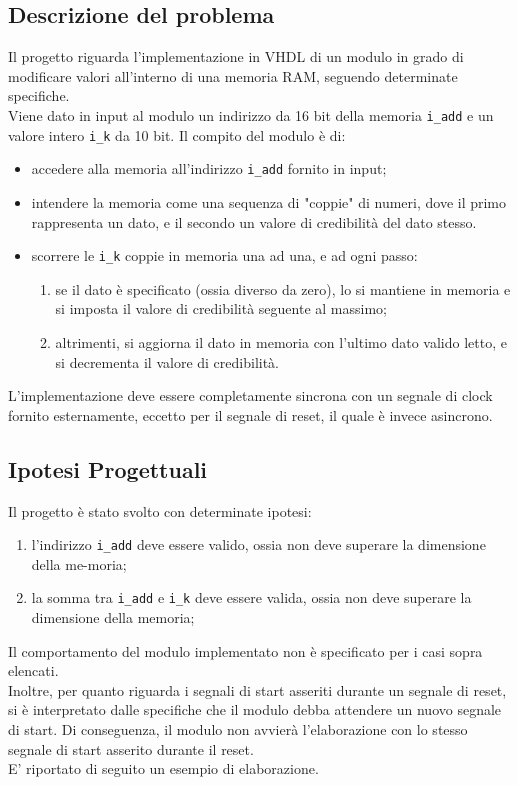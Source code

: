 \documentclass{article}
\begin{document}
\subsection{Descrizione del problema}
Il progetto riguarda l'implementazione in VHDL di un modulo in grado di modificare valori all'interno di una memoria RAM, seguendo determinate specifiche.
\bigskip
\\ Viene dato in input al modulo un indirizzo da 16 bit della memoria \texttt{i\_add} e un valore intero \texttt{i\_k} da 10 bit.
Il compito del modulo è di:
\begin{itemize}[label=\raisebox{0.25ex}{\tiny$\bullet$}]
    \item accedere alla memoria all'indirizzo \texttt{i\_add} fornito in input;
    \item intendere la memoria come una sequenza di "coppie" di numeri, dove il primo rappresenta un dato, e il secondo un
    valore di credibilità del dato stesso.
    \item scorrere le \texttt{i\_k} coppie in memoria una ad una, e ad ogni passo:
    \begin{enumerate}[label=\roman*.]
        \item se il dato è specificato (ossia diverso da zero), lo si mantiene in memoria e si imposta il valore di credibilità seguente al massimo;
        \item altrimenti, si aggiorna il dato in memoria con l'ultimo dato valido letto, e si decrementa il valore di credibilità.
    \end{enumerate}
\end{itemize}

L'implementazione deve essere completamente sincrona con un segnale di clock fornito esternamente, eccetto per il segnale di reset, il quale è invece asincrono.

\vspace{0.5cm}
\subsection{Ipotesi Progettuali}
Il progetto è stato svolto con determinate ipotesi:
\begin{enumerate}[label=\roman*.]
    \item l'indirizzo \texttt{i\_add} deve essere valido, ossia non deve superare la dimensione della me-moria;
    \item la somma tra \texttt{i\_add} e \texttt{i\_k} deve essere valida, ossia non deve superare la dimensione della memoria;
\end{enumerate}
Il comportamento del modulo implementato non è specificato per i casi sopra elencati.
\bigskip \\ Inoltre, per quanto riguarda i segnali di start asseriti durante un segnale di reset, si è interpretato dalle specifiche che il modulo debba attendere un nuovo segnale di start. Di conseguenza, il modulo non avvierà l'elaborazione con lo stesso segnale di start asserito durante il reset.
\bigskip \\ E' riportato di seguito un esempio di elaborazione.
\end{document}
